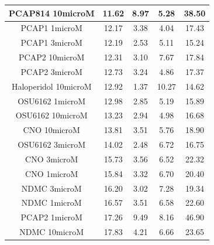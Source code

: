 \begin{table}[h!]
\begin{tabular}{|c|c|c|c|c|}
PCAP814 10microM      & 11.62 & 8.97 & 5.28  & 38.50  \\ \hline
PCAP1 1microM         & 12.17 & 3.38 & 4.04  & 17.43 \\ \hline
PCAP1 3microM         & 12.19 & 2.53 & 5.11  & 15.24 \\ \hline
PCAP2 10microM        & 12.31 & 3.10  & 7.67  & 17.84 \\ \hline
PCAP2 3microM         & 12.73 & 3.24 & 4.86  & 17.37 \\ \hline
Haloperidol 10microM  & 12.92 & 1.37 & 10.27 & 14.62 \\ \hline
OSU6162 1microM       & 12.98 & 2.85 & 5.19  & 15.89 \\ \hline
OSU6162 10microM      & 13.23 & 2.94 & 4.98  & 16.68 \\ \hline
CNO 10microM          & 13.81 & 3.51 & 5.76  & 18.90  \\ \hline
OSU6162 3microM       & 14.02 & 2.48 & 6.72  & 16.75 \\ \hline
CNO 3microM           & 15.73 & 3.56 & 6.52  & 22.32 \\ \hline
CNO 1microM           & 15.84 & 3.32 & 6.70   & 20.40  \\ \hline
NDMC 3microM          & 16.20  & 3.02 & 7.28  & 19.34 \\ \hline
NDMC 1microM          & 16.57 & 3.51 & 6.58  & 22.60  \\ \hline
PCAP2 1microM         & 17.26 & 9.49 & 8.16  & 46.90  \\ \hline
NDMC 10microM         & 17.83 & 4.21 & 6.66  & 23.65 \\ \hline
\end{tabular}
\end{table}
\newpage
